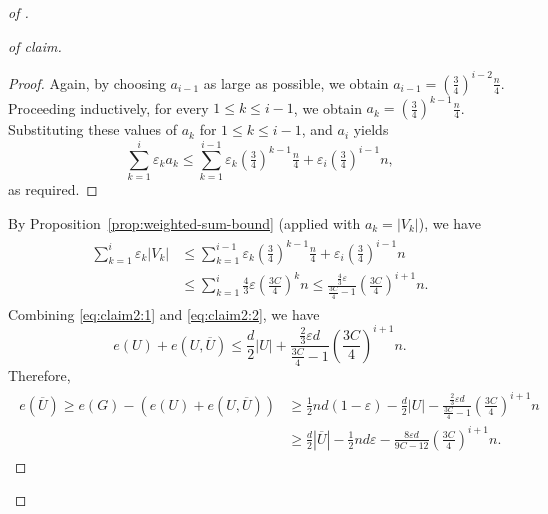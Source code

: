 \documentclass[10pt,a4paper]{amsart}
\newcommand{\eps}{\varepsilon}
\begin{document}
\begin{proof}[ of ]
\begin{proof}[ of claim]
\begin{proof}
Again, by choosing $a_{i-1}$ as large as possible, we obtain $a_{i-1} =(\tfrac34)^{i-2}\tfrac n4$. Proceeding inductively, for every $1\le k\le i-1$, we obtain
$a_k = (\tfrac34)^{k-1}\tfrac n4$.
Substituting these values of $a_k$ for $1 \le k \le i-1$, and $a_i$ yields
\[
\sum_{k=1}^i \eps_k a_k
\le
\sum_{k=1}^{i-1}
\eps_k(\tfrac34)^{k-1}\tfrac n4
+\eps_i(\tfrac34)^{i-1}n ,
\]
as required.
\end{proof}
By Proposition~\ref{prop:weighted-sum-bound} (applied with $a_k=|V_k|$), we have
		\begin{align}
			\label{eq:claim2:2}
			\begin{split}
				\sum_{k=1}^i \eps_k|V_k| 
				& \le \sum_{k=1}^{i-1} \eps_k \left(\frac{3}{4}\right)^{k-1} \frac{n}{4} + \eps_i \left(\frac{3}{4}\right)^{i-1} n  \\
				& \le \sum_{k=1}^{i} \frac{4}{3} \eps \left(\frac{3 C}{4}\right)^{k} n 
				\le \frac{\frac{4}{3} \eps}{\frac{3 C}{4}-1} \left(\frac{3 C}{4}\right)^{i+1}n.
			\end{split}
		\end{align}
		Combining \eqref{eq:claim2:1} and \eqref{eq:claim2:2}, we have $$e(U) + e(U, \overline{U}) \le \frac{d}{2} |U| + \frac{\frac{2}{3} \eps d}{\frac{3 C}{4}-1} \left(\frac{3 C}{4}\right)^{i+1}n.$$
		Therefore, 
		\begin{align} \label{claim2:eq3}
			\begin{split}
				e(\overline{U}) \ge e(G) - (e(U) + e(U, \overline{U})) 
				&\ge \frac{1}{2} nd(1-\eps) - \frac{d}{2} |U| - \frac{\frac{2}{3} \eps d}{\frac{3 C}{4}-1} \left(\frac{3 C}{4}\right)^{i+1}n \\  
				&\ge \frac{d}{2} |\overline{U}| - \frac{1}{2} n d \eps - \frac{8\eps d}{9C - 12} \left(\frac{3 C}{4}\right)^{i+1}n. 
			\end{split}
		\end{align}


\end{proof}
\end{proof}
\end{document}
